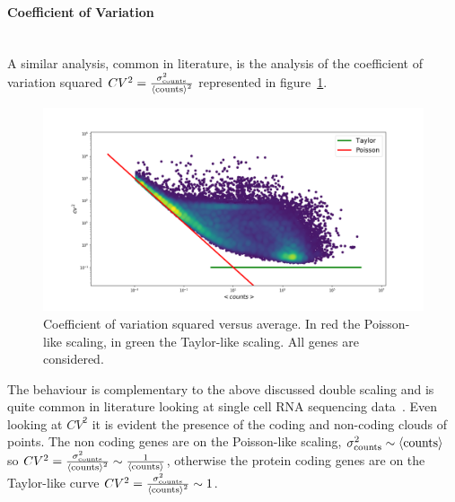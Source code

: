 \paragraph{Coefficient of Variation}\mbox{}\\
A similar analysis, common in literature, is the analysis of the coefficient of variation squared $CV^2=\frac{\sigma^2_{\mathrm{counts}}}{\left\langle \mathrm{counts}\right\rangle^2}$ represented in figure~\ref{fig:scalinglaws/gtex/allgenes/cvmean_loglog}.
\begin{figure}[htb!]
    \centering
    \includegraphics[width=0.9\linewidth]{pictures/scalinglaws/gtex/allgenes/cvmean_loglog.png}
    \caption{Coefficient of variation squared versus average. In \textcolor{pythonred}{red} the Poisson-like scaling, in \textcolor{pythongreen}{green} the Taylor-like scaling. All genes are considered.}
    \label{fig:scalinglaws/gtex/allgenes/cvmean_loglog}
\end{figure}
The behaviour is complementary to the above discussed double scaling and is quite common in literature looking at single cell RNA sequencing data~\cite{Islam2013}. Even looking at $CV^2$ it is evident the presence of the coding and non-coding clouds of points. The non coding genes are on the Poisson-like scaling, $\sigma^2_{\mathrm{counts}} \sim \left\langle \mathrm{counts}\right\rangle$ so $CV^2=\frac{\sigma^2_{\mathrm{counts}}}{\left\langle \mathrm{counts}\right\rangle^2}\sim\frac{1}{\left\langle \mathrm{counts}\right\rangle}$, otherwise the protein coding genes are on the Taylor-like curve $CV^2=\frac{\sigma^2_{\mathrm{counts}}}{\left\langle \mathrm{counts}\right\rangle^2}\sim 1$.

